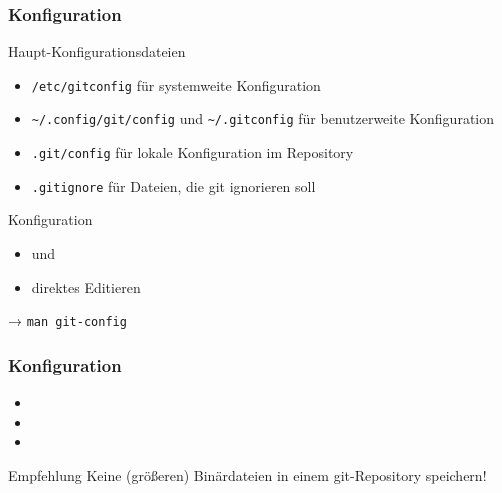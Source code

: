 \documentclass{cms-kurs}
\begin{document}
\begin{frame}[fragile]
  \frametitle{Konfiguration}

  \onslide<+->

  \begin{block}{Haupt-Konfigurationsdateien}
    \begin{itemize}
    \item \verb|/etc/gitconfig| für systemweite Konfiguration
    \item \verb|~/.config/git/config| und \verb|~/.gitconfig| für benutzerweite
      Konfiguration
    \item \verb|.git/config| für lokale Konfiguration im Repository
    \item \verb|.gitignore| für Dateien, die git ignorieren soll
    \end{itemize}

  \end{block}

  \medskip{}

  \begin{block}{Konfiguration}
    \begin{itemize}
    \item {} und 
    \item direktes Editieren
    \end{itemize}

    → \verb|man git-config|
  \end{block}
\end{frame}

\begin{frame}
  \frametitle{Konfiguration}

  \onslide<+->

  \begin{Beispiele}
    \begin{itemize}
    \item {}
    \item {}
    \item {}
    \end{itemize}
  \end{Beispiele}

  \bigskip{}

  \begin{block}{Empfehlung}
    Keine (größeren) Binärdateien in einem git-Repository speichern!
  \end{block}

\end{frame}
\end{document}
